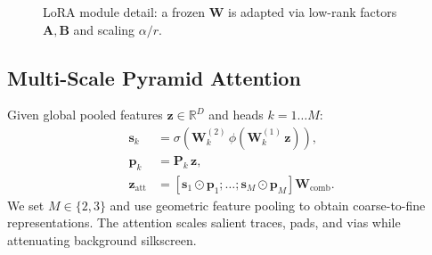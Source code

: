 \documentclass[conference]{IEEEtran}
\begin{document}
\begin{figure}[!t]
  \centering
  \caption{LoRA module detail: a frozen $\mathbf{W}$ is adapted via low-rank factors $\mathbf{A}, \mathbf{B}$ and scaling $\alpha/r$.}
  \label{fig:lora_detail}
\end{figure}

\subsection{Multi-Scale Pyramid Attention}
Given global pooled features $\mathbf{z} \in \mathbb{R}^{D}$ and heads $k=1\dots M$:
\begin{align}
\mathbf{s}_k &= \sigma\!\left( \mathbf{W}_k^{(2)}\, \phi(\mathbf{W}_k^{(1)}\, \mathbf{z}) \right), \\
\mathbf{p}_k &= \mathbf{P}_k\, \mathbf{z}, \\
\mathbf{z}_{\text{att}} &= \left[ \mathbf{s}_1 \odot \mathbf{p}_1;\dots; \mathbf{s}_M \odot \mathbf{p}_M \right] \mathbf{W}_{\text{comb}}.
\end{align}
We set $M\in\{2,3\}$ and use geometric feature pooling to obtain coarse-to-fine representations. The attention scales salient traces, pads, and vias while attenuating background silkscreen.
\end{document}
